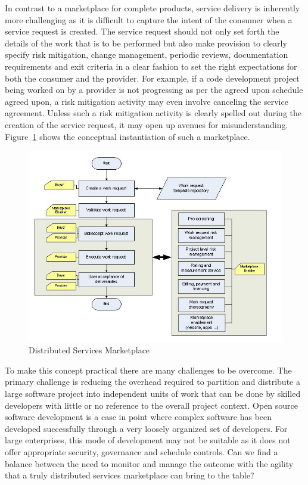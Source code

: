 In contrast to a marketplace for complete products, service delivery is inherently more challenging as it is difficult to capture the intent of the consumer when a service request is created. The service request should not only set forth the details of the work that is to be performed but also make provision to clearly specify risk mitigation, change management, periodic reviews, documentation requirements and exit criteria in a clear fashion to set the right expectations for both the consumer and the provider.  For example, if a code development project being worked on by a provider is not progressing as per the agreed upon schedule agreed upon, a risk mitigation activity may even involve canceling the service agreement. Unless such a risk mitigation activity is clearly spelled out during the creation of the service request, it may open up avenues for misunderstanding. Figure~\ref{glomarketplace} shows the conceptual instantiation of such a marketplace.

 \begin{figure}[h]
\includegraphics[scale=0.4]{figs/glomarketplace.jpg}
\caption{Distributed Services Marketplace}
\label{glomarketplace}
\end{figure}

 To make this concept practical there are many challenges to be overcome. The primary challenge is reducing the overhead required to partition and distribute a large software project into independent units of work that can be done by skilled developers with little or no reference to the overall project context. Open source software development is a case in point where complex software has been developed successfully through a very loosely organized set of developers. For large enterprises, this mode of development may not be suitable as it does not offer appropriate security, governance and schedule controls. Can we find a balance between the need to monitor and manage the outcome with the agility that a truly distributed services marketplace can bring to the table?

